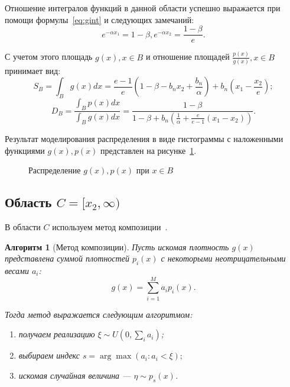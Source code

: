 \documentclass[12pt, specialist, subf, substylefile = spbu.rtx]{disser}
\newtheorem{algo}{Алгоритм}
\begin{document}
Отношение интегралов функций в данной области успешно выражается при помощи формулы~\eqref{eq:gint} и следующих замечаний:
\begin{equation}\label{eq:ex1x2}
e^{-\alpha x_1}=1-\beta, e^{-\alpha x_2}=\frac{1-\beta}{e}.
\end{equation}

С учетом этого площадь $g(x), x \in B$ и отношение площадей $\frac{p(x)}{g(x)}, x \in B$ принимает вид: 
$$
S_B=\int_B g(x)dx=\frac{e-1}{e}(1-\beta-b_nx_2+\frac{b_n}{\alpha})+b_n(x_1-\frac{x_2}{e});
$$
$$
D_B=\frac{\int_B p(x)dx}{\int_B g(x) dx}= \frac{1-\beta}{1-\beta+b_n(\frac{1}{\alpha}+\frac{e}{e-1}(x_1-x_2))}.
$$

Результат моделирования распределения в виде гистограммы с наложенными функциями $g(x), p(x)$ представлен на рисунке~\ref{ris:sectionB}. 

\begin{figure}[h]
\caption{Распределение $g(x), p(x)$ при $x \in B$}
\label{ris:sectionB}
\end{figure}



\subsection{Область $C=[x_2, \infty)$}

В области $C$ используем метод композиции~\cite{MonErm}. 

\begin{algo}[Метод композиции]\label{alg:comp}
Пусть искомая плотность $g(x)$ представлена суммой плотностей $p_i(x)$ с некоторыми неотрицательными весами $a_i$:
\begin{equation}\label{eq:comp_common}
g(x)=\sum\limits_{i=1}^M a_ip_i(x).
\end{equation}

Тогда метод выражается следующим алгоритмом:
\begin{enumerate}
\item получаем реализацию $\xi \sim U(0, \sum_i a_i)$;
\item выбираем индекс $s=\arg\max(a_i:a_i<\xi);$
\item искомая случайная величина --- $\eta \sim p_s(x)$.
\end{enumerate}
\end{algo}
\end{document}
